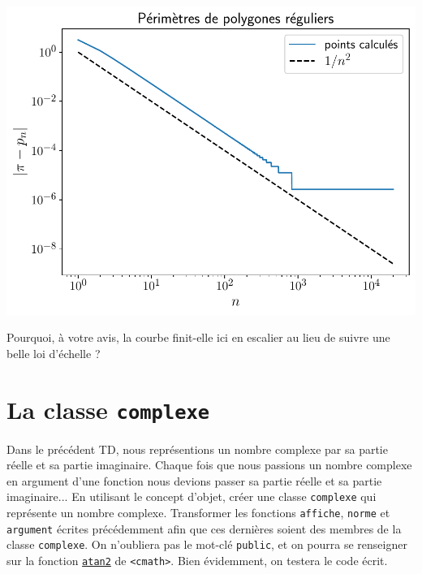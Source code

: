 \documentclass{book}
\newcommand{\inline}[1]{\texttt{#1}}
\begin{document}
\begin{correction}
\begin{center}
\includegraphics[width=0.45\paperwidth]{TD2/perimetres-polygones-reguliers.pdf}
\end{center}

Pourquoi, à votre avis, la courbe finit-elle ici en escalier au lieu de suivre une belle loi d'échelle ?

\end{correction}

\section{La classe \texttt{complexe}}
 
Dans le précédent TD, nous représentions un nombre complexe par sa partie réelle et sa partie imaginaire. Chaque fois que nous passions un nombre complexe en argument d'une fonction nous devions passer sa partie réelle et sa partie imaginaire... En utilisant le concept d'objet, créer une classe \inline{complexe} qui représente un nombre complexe. Transformer les fonctions \inline{affiche}, \inline{norme} et \inline{argument} écrites précédemment afin que ces dernières soient des membres de la classe \inline{complexe}. On n'oubliera pas le mot-clé \inline{public}, et on pourra se renseigner sur la fonction \href{http://en.cppreference.com/w/cpp/numeric/math/atan2}{\inline{atan2}} de \inline{<cmath>}. Bien évidemment, on testera le code écrit.
\end{document}
